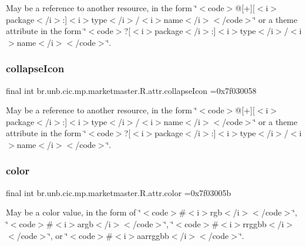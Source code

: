 May be a reference to another resource, in the form \char`\"{}$<$code$>$@\mbox{[}+\mbox{]}\mbox{[}$<$i$>$package$<$/i$>$\+:\mbox{]}$<$i$>$type$<$/i$>$/$<$i$>$name$<$/i$>$$<$/code$>$\char`\"{} or a theme attribute in the form \char`\"{}$<$code$>$?\mbox{[}$<$i$>$package$<$/i$>$\+:\mbox{]}$<$i$>$type$<$/i$>$/$<$i$>$name$<$/i$>$$<$/code$>$\char`\"{}. \mbox{\label{classbr_1_1unb_1_1cic_1_1mp_1_1marketmaster_1_1R_1_1attr_a315758b306c57cce5490833c7ea85df9}} 
\subsubsection{\texorpdfstring{collapse\+Icon}{collapseIcon}}
{\footnotesize\ttfamily final int br.\+unb.\+cic.\+mp.\+marketmaster.\+R.\+attr.\+collapse\+Icon =0x7f030058\hspace{0.3cm}{\ttfamily [static]}}

May be a reference to another resource, in the form \char`\"{}$<$code$>$@\mbox{[}+\mbox{]}\mbox{[}$<$i$>$package$<$/i$>$\+:\mbox{]}$<$i$>$type$<$/i$>$/$<$i$>$name$<$/i$>$$<$/code$>$\char`\"{} or a theme attribute in the form \char`\"{}$<$code$>$?\mbox{[}$<$i$>$package$<$/i$>$\+:\mbox{]}$<$i$>$type$<$/i$>$/$<$i$>$name$<$/i$>$$<$/code$>$\char`\"{}. \mbox{\label{classbr_1_1unb_1_1cic_1_1mp_1_1marketmaster_1_1R_1_1attr_a55b7da6fc353b6eae7cc4a4f04f7dfe2}} 
\subsubsection{\texorpdfstring{color}{color}}
{\footnotesize\ttfamily final int br.\+unb.\+cic.\+mp.\+marketmaster.\+R.\+attr.\+color =0x7f03005b\hspace{0.3cm}{\ttfamily [static]}}

May be a color value, in the form of \char`\"{}$<$code$>$\#$<$i$>$rgb$<$/i$>$$<$/code$>$\char`\"{}, \char`\"{}$<$code$>$\#$<$i$>$argb$<$/i$>$$<$/code$>$\char`\"{}, \char`\"{}$<$code$>$\#$<$i$>$rrggbb$<$/i$>$$<$/code$>$\char`\"{}, or \char`\"{}$<$code$>$\#$<$i$>$aarrggbb$<$/i$>$$<$/code$>$\char`\"{}. \mbox{\label{classbr_1_1unb_1_1cic_1_1mp_1_1marketmaster_1_1R_1_1attr_a627dab7cff5851a3edf839866a455f90}} 
